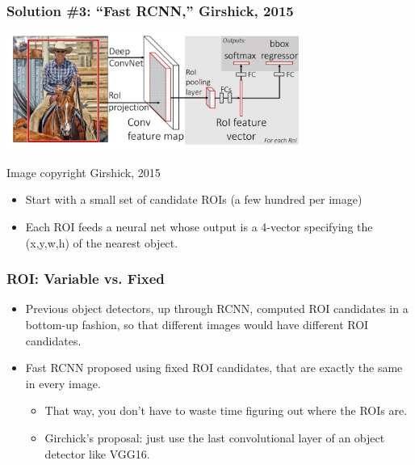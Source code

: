 \documentclass{beamer}
\begin{document}
\begin{frame}
  \frametitle{Solution \#3: ``Fast RCNN,'' Girshick, 2015}
  \centerline{\includegraphics[height=1.5in]{figs/girshick2015_fig1.png}}
  \begin{tiny}Image copyright Girshick, 2015\end{tiny}
  \begin{itemize}
  \item Start with a small set of candidate ROIs (a few hundred
    per image)
  \item Each ROI feeds a neural net whose output is a 4-vector
    specifying the (x,y,w,h) of the nearest object.
  \end{itemize}
\end{frame}

\begin{frame}
  \frametitle{ROI: Variable vs. Fixed}
  \begin{itemize}
  \item Previous object detectors, up through RCNN, computed ROI
    candidates in a bottom-up fashion, so that different images would
    have different ROI candidates.
  \item Fast RCNN proposed using fixed ROI candidates, that are exactly the
    same in every image.
    \begin{itemize}
    \item That way, you don't have to waste time figuring out where the ROIs are.
    \item Girchick's proposal: just use 
      the last convolutional layer of an object detector like VGG16.
    \end{itemize}
  \end{itemize}
\end{frame}
\end{document}
